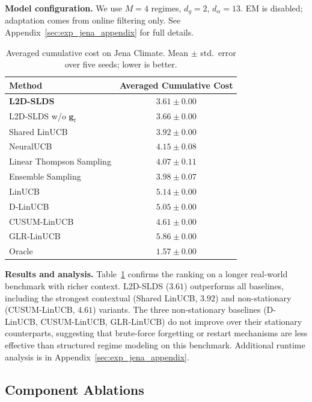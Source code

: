 \textbf{Model configuration.}
We use \(M=4\) regimes, \(d_g=2\), \(d_\alpha=13\). EM is disabled; adaptation comes from online
filtering only. See Appendix~\ref{sec:exp_jena_appendix} for full details.

\begin{table}[ht]
\centering
\small
\setlength{\tabcolsep}{4pt}
\caption{Averaged cumulative cost on Jena Climate.
Mean \(\pm\) std.\ error over five seeds; lower is better.}
\label{tab:exp_avg_costs_jena}
\begin{tabular}{@{}lc@{}}
\toprule
Method & Averaged Cumulative Cost \\
\midrule
\textbf{L2D-SLDS} & \(\mathbf{3.61 \pm 0.00}\) \\
L2D-SLDS w/o \(\mathbf{g}_t\) & \(3.66 \pm 0.00\) \\
\midrule
Shared LinUCB & \(3.92 \pm 0.00\) \\
NeuralUCB & \(4.15 \pm 0.08\) \\
Linear Thompson Sampling & \(4.07 \pm 0.11\) \\
Ensemble Sampling & \(3.98 \pm 0.07\) \\
LinUCB & \(5.14 \pm 0.00\) \\
D-LinUCB & \(5.05 \pm 0.00\) \\
CUSUM-LinUCB & \(4.61 \pm 0.00\) \\
GLR-LinUCB & \(5.86 \pm 0.00\) \\
\midrule
Oracle & \(1.57 \pm 0.00\) \\
\bottomrule
\end{tabular}
\end{table}

\textbf{Results and analysis.}
Table~\ref{tab:exp_avg_costs_jena} confirms the ranking on a longer real-world benchmark with richer
context. L2D-SLDS (\(3.61\)) outperforms all baselines, including the strongest contextual
(Shared LinUCB, \(3.92\)) and non-stationary (CUSUM-LinUCB, \(4.61\)) variants.
The three non-stationary baselines (D-LinUCB, CUSUM-LinUCB, GLR-LinUCB) do not improve over their
stationary counterparts, suggesting that brute-force forgetting or restart mechanisms are less
effective than structured regime modeling on this benchmark. Additional runtime analysis is in
Appendix~\ref{sec:exp_jena_appendix}.

\subsection{Component Ablations}
\label{sec:ablations}

